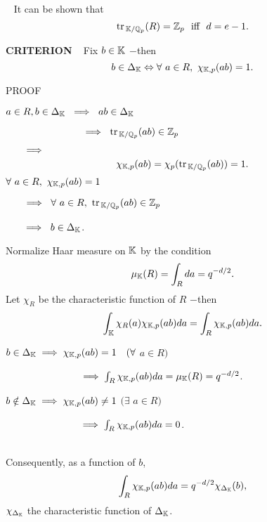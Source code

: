 \vspace{0.1cm}

\begin{x}{\small\bf {}} \ %
It can be shown that
\[
\text{tr}\hspace{0.05cm}_{\mathbb{K}/ \mathbb{Q}_p}(R) = \mathbb{Z}_p \ \text{ iff } \ d = e-1.
\]
\end{x}

\vspace{0.1cm}

\begin{x}{\small\bf CRITERION} \ %
Fix $b \in \mathbb{K}$ $-$then
\[
b \in \Delta_{\mathbb{K}} \Leftrightarrow \forall \  a \in R, \ \chi_{\mathbb{K},p}(ab) = 1.
\]

\vspace{0.1cm}

PROOF \ 

\indent\indent \textbullet \quad 
$a \in R, b \in \Delta_{\mathbb{K}}  \ \implies\  ab \in \Delta_{\mathbb{K}}$

$\indent\indent\indent\indent\indent\implies\  \tr_{\K/ \Q_p}(ab) \in \Z_p$

$\indent\implies$
\[
\chi_{\mathbb{K},p}(ab) = \chi_p(\text{tr}\hspace{0.05cm}_{\mathbb{K}/ \mathbb{Q}_p}(ab)) = 1.
\]
\indent\indent\textbullet \quad 
$\forall \ a \in R, \ \chi_{\K,p}(ab) = 1$ 

$\indent\implies\ \forall \ a \in R, \  \tr_{\K/ \Q_p}(ab) \in \Z_p$

$\indent\implies\  b \in \Delta_\K$.

Normalize Haar measure on $\mathbb{K}$ by the condition
\[
\mu_{\mathbb{K}}(R) = \int_{R} da = q^{-d/2}.
\]
Let $\chi_R$ be the characteristic function of $R$ $-$then
\[
\int_{\mathbb{K}} \chi_R(a) \chi_{\mathbb{K},p}(ab) da = \int_R \chi_{\mathbb{K},p}(ab)da.
\]

\indent\indent\textbullet \quad 
$b \in \Delta_{\mathbb{K}} \implies \chi_{\mathbb{K},p}(ab) = 1 \quad (\forall$ $a \in R)$

$\hspace{2.65cm} \implies \int_R\chi_{\mathbb{K},p}(ab)da = \mu_{\mathbb{K}}(R) = q^{-d/2}$.

\indent\indent\textbullet \quad 
$b \notin \Delta_{\mathbb{K}} \implies \chi_{\mathbb{K},p}(ab) \ne 1$ $(\exists$ $a \in R)$  

$\hspace{2.65cm}\implies \int_R\chi_{\mathbb{K},p}(ab)da = 0$.


\text{}\\
Consequently, as a function of $b$,
\[
\int_R\chi_{\mathbb{K},p}(ab)da =q^{-d/2} \chi_{\Delta_{\mathbb{K}}} (b),
\]
$\chi_{\Delta_{\mathbb{K}}}$ the characteristic function of $\Delta_{\mathbb{K}}$.
\end{x}

